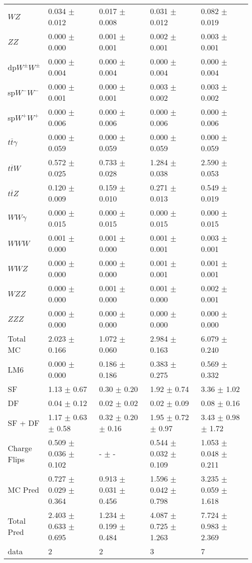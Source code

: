 \begin{tabular}{l | l l l l}
$WZ$ &  0.034 $\pm$  0.012 &  0.017 $\pm$  0.008 &  0.031 $\pm$  0.012 &  0.082 $\pm$  0.019\\
$ZZ$ &   0.000 $\pm$   0.000 &  0.001 $\pm$  0.001 &  0.002 $\pm$  0.001 &  0.003 $\pm$  0.001\\
\hline
dp$W^{\pm}W^{\pm}$ &  0.000 $\pm$  0.004 &  0.000 $\pm$  0.004 &  0.000 $\pm$  0.004 &  0.000 $\pm$  0.004\\
sp$W^{-}W^{-}$ &  0.000 $\pm$  0.001 &  0.000 $\pm$  0.001 &  0.003 $\pm$  0.002 &  0.003 $\pm$  0.002\\
sp$W^{+}W^{+}$ &  0.000 $\pm$  0.006 &  0.000 $\pm$  0.006 &  0.000 $\pm$  0.006 &  0.000 $\pm$  0.006\\
$t\overline{t}\gamma$ &  0.000 $\pm$  0.059 &  0.000 $\pm$  0.059 &  0.000 $\pm$  0.059 &  0.000 $\pm$  0.059\\
$t\overline{t}W$ &  0.572 $\pm$  0.025 &  0.733 $\pm$  0.028 &  1.284 $\pm$  0.038 &  2.590 $\pm$  0.053\\
$t\overline{t}Z$ &  0.120 $\pm$  0.009 &  0.159 $\pm$  0.010 &  0.271 $\pm$  0.013 &  0.549 $\pm$  0.019\\
$WW\gamma$ &  0.000 $\pm$  0.015 &  0.000 $\pm$  0.015 &  0.000 $\pm$  0.015 &  0.000 $\pm$  0.015\\
$WWW$ &  0.001 $\pm$   0.000 &  0.001 $\pm$   0.000 &  0.001 $\pm$  0.001 &  0.003 $\pm$  0.001\\
$WWZ$ &   0.000 $\pm$   0.000 &   0.000 $\pm$   0.000 &  0.001 $\pm$  0.001 &  0.001 $\pm$  0.001\\
$WZZ$ &   0.000 $\pm$   0.000 &  0.001 $\pm$   0.000 &  0.001 $\pm$   0.000 &  0.002 $\pm$  0.001\\
$ZZZ$ &   0.000 $\pm$   0.000 &   0.000 $\pm$   0.000 &   0.000 $\pm$   0.000 &   0.000 $\pm$   0.000\\
\hline
Total MC &  2.023 $\pm$  0.166 &  1.072 $\pm$  0.060 &  2.984 $\pm$  0.163 &  6.079 $\pm$  0.240\\
\hline\hline
\hline
LM6 &  0.000 $\pm$  0.000 &  0.186 $\pm$  0.186 &  0.383 $\pm$  0.275 &  0.569 $\pm$  0.332\\
\hline\hline
\hline\hline
 SF  & 1.13 $\pm$ 0.67 & 0.30 $\pm$ 0.20 & 1.92 $\pm$ 0.74 & 3.36 $\pm$ 1.02\\
 DF  & 0.04 $\pm$ 0.12 & 0.02 $\pm$ 0.02 & 0.02 $\pm$ 0.09 & 0.08 $\pm$ 0.16\\
\hline
 SF + DF  & 1.17 $\pm$ 0.63 $\pm$ 0.58 & 0.32 $\pm$ 0.20 $\pm$ 0.16 & 1.95 $\pm$ 0.72 $\pm$ 0.97 & 3.43 $\pm$ 0.98 $\pm$ 1.72\\
\hline\hline
Charge Flips & 0.509 $\pm$ 0.036 $\pm$ 0.102 & - $\pm$ - & 0.544 $\pm$ 0.032 $\pm$ 0.109 & 1.053 $\pm$ 0.048 $\pm$ 0.211\\
\hline\hline
\hline
MC Pred &  0.727 $\pm$  0.029 $\pm$  0.364 &  0.913 $\pm$  0.031 $\pm$  0.456 &  1.596 $\pm$  0.042 $\pm$  0.798 &  3.235 $\pm$  0.059 $\pm$  1.618\\
\hline\hline
Total Pred &  2.403 $\pm$  0.633 $\pm$  0.695 &  1.234 $\pm$  0.199 $\pm$  0.484 &  4.087 $\pm$  0.725 $\pm$  1.263 &  7.724 $\pm$  0.983 $\pm$  2.369\\
\hline\hline
data & 2 & 2 & 3 & 7\\
\hline\hline
\end{tabular}
